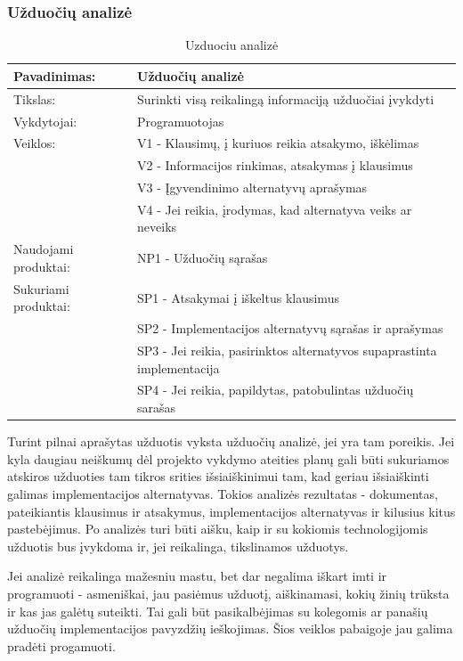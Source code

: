 \documentclass{VUMIFPSkursinis}
\begin{document}
	\subsubsection{Užduočių analizė}
	\begin{center}
		\begin{table}[ht]
		\caption{Uzduociu analizė}
		\begin{tabular}{ | l | l | } 
		\hline
		Pavadinimas:         & Užduočių analizė                               \\ \hline
		Tikslas: 	           & Surinkti visą reikalingą informaciją užduočiai įvykdyti\\ \hline
		Vykdytojai:          & Programuotojas                          \\ \hline
		Veiklos:             & V1 - Klausimų, į kuriuos reikia atsakymo, iškėlimas												\\ 
						             & V2 - Informacijos rinkimas, atsakymas į klausimus\\ 
					 	             & V3 - Įgyvendinimo alternatyvų aprašymas\\
					 	             & V4 - Jei reikia, įrodymas, kad alternatyva veiks ar neveiks							 \\ \hline
		Naudojami produktai: & NP1 - Užduočių sąrašas 																																															 \\ \hline
		Sukuriami produktai: & SP1 - Atsakymai į iškeltus klausimus\\
								& SP2 - Implementacijos alternatyvų sąrašas ir aprašymas \\
								& SP3 - Jei reikia, pasirinktos alternatyvos supaprastinta implementacija\\ 
								& SP4 - Jei reikia, papildytas, patobulintas užduočių sarašas\\\hline
		\end{tabular}
	\end{table}
		\end{center}
	Turint pilnai aprašytas užduotis vyksta užduočių analizė, jei yra tam poreikis. Jei kyla daugiau neiškumų dėl projekto vykdymo ateities planų gali būti sukuriamos atskiros užduoties tam tikros srities išsiaiškinimui tam, kad geriau išsiaiškinti galimas implementacijos alternatyvas. Tokios analizės rezultatas - dokumentas, pateikiantis klausimus ir atsakymus, implementacijos alternatyvas ir kilusius kitus pastebėjimus. Po analizės turi būti aišku, kaip ir su kokiomis technologijomis užduotis bus įvykdoma ir, jei reikalinga, tikslinamos užduotys. 
	\par Jei analizė reikalinga mažesniu mastu, bet dar negalima iškart imti ir programuoti - asmeniškai, jau pasiėmus užduotį, aiškinamasi, kokių žinių trūksta ir kas jas galėtų suteikti. Tai gali būt pasikalbėjimas su kolegomis ar panašių užduočių implementacijos pavyzdžių ieškojimas. Šios veiklos pabaigoje jau galima pradėti progamuoti.
\end{document}
